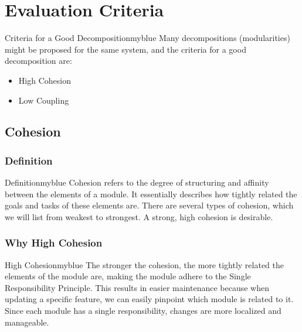 \newpage
\null

\section{Evaluation Criteria}
\begin{prettyBox}{Criteria for a Good Decomposition}{myblue}
Many decompositions (modularities) might be proposed for the same system, and the criteria for a good decomposition are:
\begin{itemize}
    \item High Cohesion
    \item Low Coupling
\end{itemize}
\end{prettyBox}

\vspace{0.35cm}
\subsection{Cohesion}

\subsubsection{Definition}
\begin{prettyBox}{Definition}{myblue}
Cohesion refers to the degree of structuring and affinity between the elements
of a module. It essentially describes how tightly related the goals and tasks
of these elements are. There are several types of cohesion, which we will list
from weakest to strongest. A strong, high cohesion is desirable.
\end{prettyBox}

\vspace{0.35cm}


\subsubsection{Why High Cohesion}
\begin{prettyBox}{High Cohesion}{myblue}
The stronger the cohesion, the more tightly related the elements of the module
are, making the module adhere to the Single Responsibility Principle. This
results in easier maintenance because when updating a specific feature,
we can easily pinpoint which module is related to it. Since each module has
a single responsibility, changes are more localized and manageable.
\end{prettyBox}

\vspace{0.35cm}

